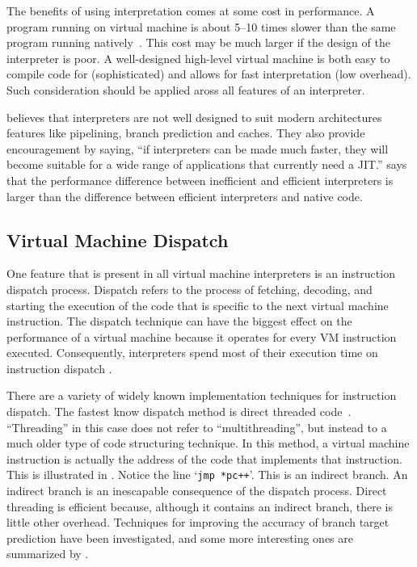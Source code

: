 		The benefits of using interpretation comes at some cost in performance. A program running on virtual machine is about 5--10 times slower than the same program running natively~\citep{optimizingindirectbranch}. This cost may be much larger if the design of the interpreter is poor. A well-designed high-level virtual machine is both easy to compile code for (sophisticated) and allows for fast interpretation (low overhead). Such consideration should be applied aross all features of an interpreter.
		
		\cite{fastjava} believes that interpreters are not well designed to suit modern architectures features like pipelining, branch prediction and caches. They also provide encouragement by saying, ``if interpreters can be made much faster, they will become suitable for a wide range of applications that currently need a JIT.'' \cite[]{structureinterpreters} says that the performance difference between inefficient and efficient interpreters is larger than the difference between efficient interpreters and native code.
		
		\subsection{Virtual Machine Dispatch}
		One feature that is present in all virtual machine interpreters is an instruction dispatch process. Dispatch refers to the process of fetching, decoding, and starting the execution of the code that is specific to the next virtual machine instruction. The dispatch technique can have the biggest effect on the performance of a virtual machine because it operates for every VM instruction executed. Consequently, interpreters spend most of their execution time on instruction dispatch \citep{modernarchvm}. 
		
		There are a variety of widely known implementation techniques for instruction dispatch. The fastest know dispatch method is direct threaded code~\citep{structureinterpreters}. ``Threading'' in this case does not refer to ``multithreading'', but instead to a much older type of code structuring technique. In this method, a virtual machine instruction is actually the address of the code that implements that instruction. This is illustrated in . Notice the line `\texttt{jmp *pc++}'. This is an indirect branch. An indirect branch is an inescapable consequence of the dispatch process. Direct threading is efficient because, although it contains an indirect branch, there is little other overhead. Techniques for improving the accuracy of branch target prediction have been investigated, and some more interesting ones are summarized by \cite{optimizingindirectbranch}. 
		
